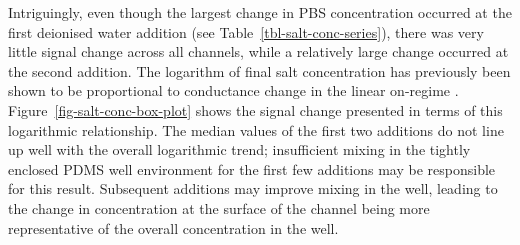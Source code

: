 \documentclass[
  a4paper,
]{scrbook}
\begin{document}
Intriguingly, even though the largest change in PBS concentration
occurred at the first deionised water addition (see
Table~\ref{tbl-salt-conc-series}), there was very little signal change
across all channels, while a relatively large change occurred at the
second addition. The logarithm of final salt concentration has
previously been shown to be proportional to conductance change in the
linear on-regime \autocite{Heller2010}.
Figure~\ref{fig-salt-conc-box-plot} shows the signal change presented in
terms of this logarithmic relationship. The median values of the first
two additions do not line up well with the overall logarithmic trend;
insufficient mixing in the tightly enclosed PDMS well environment for
the first few additions may be responsible for this result. Subsequent
additions may improve mixing in the well, leading to the change in
concentration at the surface of the channel being more representative of
the overall concentration in the well.
\end{document}
